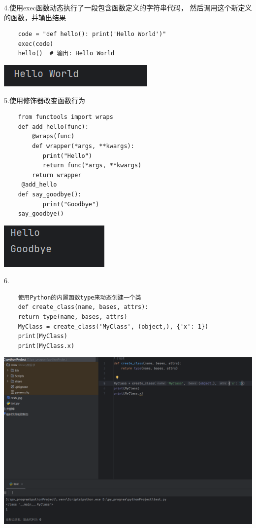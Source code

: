 \documentclass{article}
\begin{document}
4.使用exec函数动态执行了一段包含函数定义的字符串代码，
然后调用这个新定义的函数，并输出结果

\begin{verbatim}
	code = "def hello(): print('Hello World')"
	exec(code)
	hello()  # 输出: Hello World
\end{verbatim}


\noindent
\begin{minipage}{\linewidth}
	\centering
	\includegraphics[width=0.5\linewidth]{t4.png}
	\label{fig:example}
\end{minipage}



5.使用修饰器改变函数行为
\begin{verbatim}
    from functools import wraps
    def add_hello(func):
        @wraps(func)
        def wrapper(*args, **kwargs):
           print("Hello")
           return func(*args, **kwargs)
        return wrapper
     @add_hello
    def say_goodbye():
           print("Goodbye")
    say_goodbye()
\end{verbatim}

\noindent
\begin{minipage}{\linewidth}
 \centering
  \includegraphics[width=0.5\linewidth]{t5.png}
  \label{fig:example}
\end{minipage}

6.
\begin{verbatim} 
	使用Python的内置函数type来动态创建一个类
	def create_class(name, bases, attrs):
	return type(name, bases, attrs)
	MyClass = create_class('MyClass', (object,), {'x': 1})
	print(MyClass)
	print(MyClass.x)
\end{verbatim}

\noindent
\begin{minipage}{\linewidth}
	\centering
	\includegraphics[width=0.5\linewidth]{t6.png}
	\label{fig:example}
\end{minipage}
\end{document}
